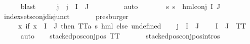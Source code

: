 \begin{isabellebody}
\ \ \ \ \isamarkupfalse%
\ blast\isanewline
\ \ \isamarkupfalse%
\ \isamarkupfalse%
\ j\ \ {\isachardoublequoteopen}j\ {\isasymin}\ I\ {\isasyminter}\ J{\isachardoublequoteclose}\ \isanewline
\ \ \ \ \isamarkupfalse%
\ {\isachardoublequoteopen}{}{\isachardoublequoteclose}\ \isamarkupfalse%
\ auto\ \isanewline
\ \ \isamarkupfalse%
\ {}\ \isamarkupfalse%
\ {\isachardoublequoteopen}{\isacharparenleft}{\kern0pt}{\isasymforall}s{\isachardot}{\kern0pt}\ {\isasymnot}{\isacharparenleft}{\kern0pt}s\ {\isasymTurnstile}\ hml{\isacharunderscore}{\kern0pt}conj\ I\ J\ {\isasymPhi}{\isacharparenright}{\kern0pt}{\isacharparenright}{\kern0pt}{\isachardoublequoteclose}\isanewline
\ \ \ \ \isamarkupfalse%
\ index{\isacharunderscore}{\kern0pt}sets{\isacharunderscore}{\kern0pt}conj{\isacharunderscore}{\kern0pt}disjunct\ \isanewline
\ \ \ \ \isamarkupfalse%
\ presburger\isanewline
\ \ \isamarkupfalse%
\ {\isasymPsi}\ \ {\isachardoublequoteopen}{\isasymPsi}\ {\isacharequal}{\kern0pt}\ {\isacharparenleft}{\kern0pt}{\isasymlambda}x{\isachardot}{\kern0pt}\ if\ x\ {\isasymin}\ {\isacharparenleft}{\kern0pt}I\ {\isasyminter}\ J{\isacharparenright}{\kern0pt}\ then\ TT{\isacharcolon}{\kern0pt}{\isacharcolon}{\kern0pt}{\isacharparenleft}{\kern0pt}{\isacharprime}{\kern0pt}a{\isacharcomma}{\kern0pt}\ {\isacharprime}{\kern0pt}s{\isacharparenright}{\kern0pt}\ hml\ else\ undefined{\isacharparenright}{\kern0pt}{\isachardoublequoteclose}\isanewline
\ \ \isamarkupfalse%
\ {\isacartoucheopen}j\ {\isasymin}\ I\ {\isasyminter}\ J{\isacartoucheclose}\ \isamarkupfalse%
\ {\isachardoublequoteopen}{\isasymPsi}\ {\isacharbackquote}{\kern0pt}\ {\isacharparenleft}{\kern0pt}I\ {\isasyminter}\ J{\isacharparenright}{\kern0pt}\ {\isacharequal}{\kern0pt}\ {\isacharbraceleft}{\kern0pt}TT{\isacharbraceright}{\kern0pt}{\isachardoublequoteclose}\ \isanewline
\ \ \ \ \isamarkupfalse%
\ auto\isanewline
\ \ \isamarkupfalse%
\ {\isachardoublequoteopen}stacked{\isacharunderscore}{\kern0pt}pos{\isacharunderscore}{\kern0pt}conj{\isacharunderscore}{\kern0pt}pos\ TT{\isachardoublequoteclose}\ \isanewline
\ \ \ \ \isamarkupfalse%
\ stacked{\isacharunderscore}{\kern0pt}pos{\isacharunderscore}{\kern0pt}conj{\isacharunderscore}{\kern0pt}pos{\isachardot}{\kern0pt}intros{\isacharparenleft}{\kern0pt}{}{\isacharparenright}{\kern0pt}\ \isamarkupfalse%

\end{isabellebody}

